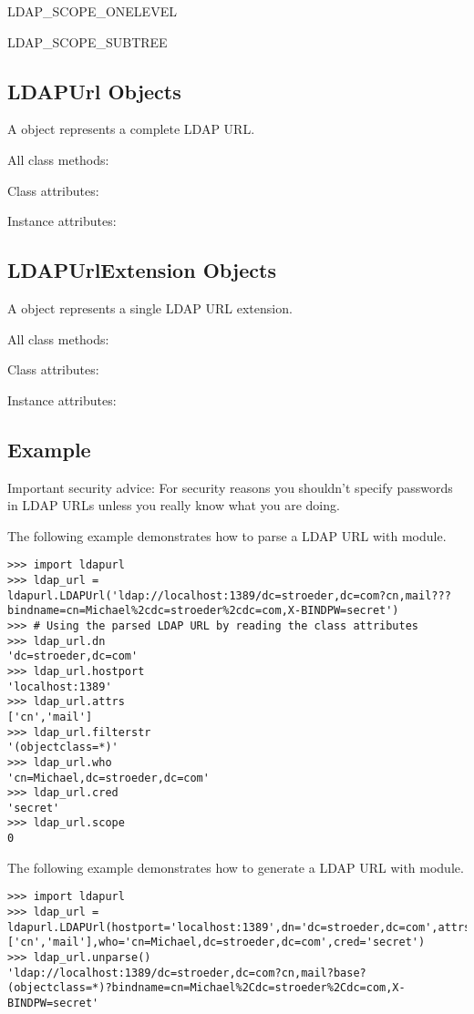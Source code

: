 \begin{datadesc}{LDAP_SCOPE_ONELEVEL}
  
\end{datadesc}

\begin{datadesc}{LDAP_SCOPE_SUBTREE}
  
\end{datadesc}


\begin{seealso}
\end{seealso}

\subsection{LDAPUrl Objects \label{ldapurl-ldapurl}}
A  object represents a complete LDAP URL.

All class methods:

Class attributes:

Instance attributes:


\subsection{LDAPUrlExtension Objects \label{ldapurl-ldapurlextension}}
A  object represents a single LDAP URL extension.

All class methods:

Class attributes:

Instance attributes:


\subsection{Example \label{ldapurl-example}}

Important security advice:
For security reasons you shouldn't specify passwords in LDAP URLs
unless you really know what you are doing.

The following example demonstrates how to parse a LDAP URL
with  module.

\begin{verbatim}
>>> import ldapurl
>>> ldap_url = ldapurl.LDAPUrl('ldap://localhost:1389/dc=stroeder,dc=com?cn,mail???bindname=cn=Michael%2cdc=stroeder%2cdc=com,X-BINDPW=secret')
>>> # Using the parsed LDAP URL by reading the class attributes
>>> ldap_url.dn
'dc=stroeder,dc=com'
>>> ldap_url.hostport
'localhost:1389'
>>> ldap_url.attrs
['cn','mail']
>>> ldap_url.filterstr
'(objectclass=*)'
>>> ldap_url.who
'cn=Michael,dc=stroeder,dc=com'
>>> ldap_url.cred
'secret'
>>> ldap_url.scope
0
\end{verbatim}

The following example demonstrates how to generate a LDAP URL
with  module.

\begin{verbatim}
>>> import ldapurl
>>> ldap_url = ldapurl.LDAPUrl(hostport='localhost:1389',dn='dc=stroeder,dc=com',attrs=['cn','mail'],who='cn=Michael,dc=stroeder,dc=com',cred='secret')
>>> ldap_url.unparse()
'ldap://localhost:1389/dc=stroeder,dc=com?cn,mail?base?(objectclass=*)?bindname=cn=Michael%2Cdc=stroeder%2Cdc=com,X-BINDPW=secret'
\end{verbatim}
